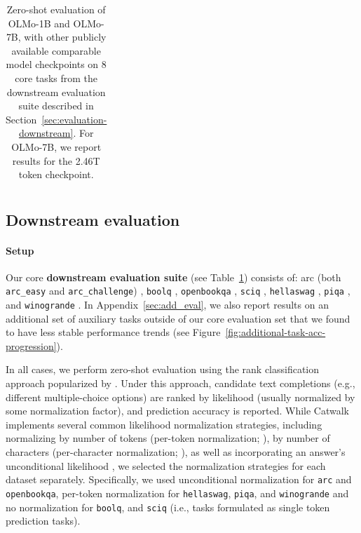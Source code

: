 \documentclass[11pt]{article}
\newcommand{\model}{OLMo-7B\xspace}
\newcommand{\modelsmall}{OLMo-1B\xspace}
\begin{document}
\begin{table}[t]
\begin{tabular}{@{}l|cccccccc|c
}
\bottomrule
\end{tabular}
\caption{Zero-shot evaluation of \modelsmall and \model, with other publicly available comparable model checkpoints on 8 core tasks from the downstream evaluation suite described in Section~\ref{sec:evaluation-downstream}. For \model, we report results for the 2.46T token checkpoint.}
\label{table:results-end-task}
\end{table}

\subsection{Downstream evaluation} 
\label{sec:downstream_evaluation}
\paragraph{Setup} Our core \textbf{downstream evaluation suite}  (see Table~\ref{table:results-end-task}) consists of: arc (both \texttt{arc\_easy} and \texttt{arc\_challenge}) \citep{clark2018think}, \texttt{boolq} \citep{clark2019boolq}, \texttt{openbookqa} \citep{mihaylov2018can}, \texttt{sciq} \citep{welbl2017crowdsourcing}, \texttt{hellaswag} \citep{zellers2019hellaswag}, \texttt{piqa} \citep{bisk2020piqa}, 
and \texttt{winogrande} \citep{sakaguchi2021winogrande}. In Appendix~\ref{sec:add_eval}, we also report results on an additional set of auxiliary tasks outside of our core evaluation set that we found to have less stable performance trends (see Figure~\ref{fig:additional-task-acc-progression}). 

In all cases, we perform zero-shot evaluation using the rank classification approach popularized by \citet{Brown2020LanguageMA}. Under this approach, candidate text completions (e.g., different multiple-choice options) are ranked by likelihood (usually normalized by some normalization factor), and prediction accuracy is reported. While Catwalk implements several common likelihood normalization strategies, including normalizing by number of tokens (per-token normalization; \citealp{Brown2020LanguageMA,liang2022holistic}), by number of characters (per-character normalization; \citealp{eval-harness}), as well as incorporating an answer's unconditional likelihood \citep{Brown2020LanguageMA}, we selected the normalization strategies for each dataset separately. Specifically, we used unconditional normalization for \texttt{arc} and \texttt{openbookqa}, per-token normalization for \texttt{hellaswag}, \texttt{piqa}, and \texttt{winogrande} and no normalization for \texttt{boolq}, 
and \texttt{sciq} (i.e., tasks formulated as single token prediction tasks). 
\end{document}
